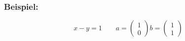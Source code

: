 \subsubsection{Beispiel:} 
\begin{equation*}
x-y=1 \qquad a=\begin{pmatrix} 1 \\ 0 \end{pmatrix} b=\begin{pmatrix} 1 \\ 1 \end{pmatrix}
\end{equation*}
%
%
%
%
